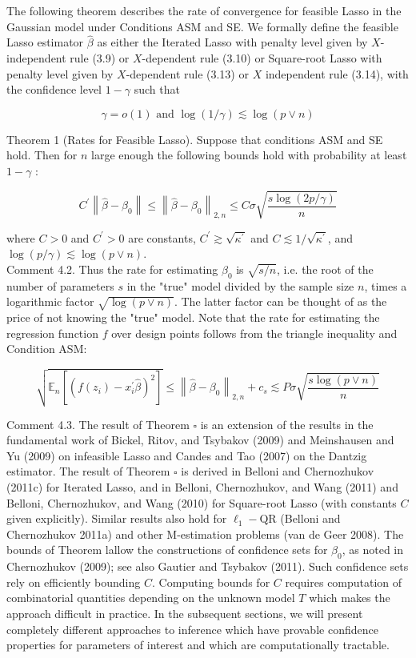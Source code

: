 \documentclass[10pt]{article}
\begin{document}
The following theorem describes the rate of convergence for feasible Lasso in the Gaussian model under Conditions ASM and SE. We formally define the feasible Lasso estimator \(\widehat{\beta}\) as either the Iterated Lasso with penalty level given by \(X\)-independent rule (3.9) or \(X\)-dependent rule (3.10) or Square-root Lasso with penalty level given by \(X\)-dependent rule (3.13) or \(X\) independent rule (3.14), with the confidence level \(1-\gamma\) such that

\[
\gamma=o(1) \text { and } \log (1 / \gamma) \lesssim \log (p \vee n)
\]

Theorem 1 (Rates for Feasible Lasso). Suppose that conditions ASM and SE hold. Then for \(n\) large enough the following bounds hold with probability at least \(1-\gamma\) :

\[
C^{\prime}\left\|\widehat{\beta}-\beta_{0}\right\| \leqslant\left\|\widehat{\beta}-\beta_{0}\right\|_{2, n} \leqslant C \sigma \sqrt{\frac{s \log (2 p / \gamma)}{n}}
\]

where \(C>0\) and \(C^{\prime}>0\) are constants, \(C^{\prime} \gtrsim \sqrt{\kappa^{\prime}}\) and \(C \lesssim 1 / \sqrt{\kappa^{\prime}}\), and \(\log (p / \gamma) \lesssim \log (p \vee n)\).\\
Comment 4.2. Thus the rate for estimating \(\beta_{0}\) is \(\sqrt{s / n}\), i.e. the root of the number of parameters \(s\) in the "true" model divided by the sample size \(n\), times a logarithmic factor \(\sqrt{\log (p \vee n)}\). The latter factor can be thought of as the price of not knowing the "true" model. Note that the rate for estimating the regression function \(f\) over design points follows from the triangle inequality and Condition ASM:

\[
\sqrt{\mathbb{E}_{n}\left[\left(f\left(z_{i}\right)-x_{i}^{\prime} \widehat{\beta}\right)^{2}\right]} \leqslant\left\|\widehat{\beta}-\beta_{0}\right\|_{2, n}+c_{s} \lesssim P \sigma \sqrt{\frac{s \log (p \vee n)}{n}}
\]

Comment 4.3. The result of Theorem \(\square\) is an extension of the results in the fundamental work of Bickel, Ritov, and Tsybakov (2009) and Meinshausen and Yu (2009) on infeasible Lasso and Candes and Tao (2007) on the Dantzig estimator. The result of Theorem \(\square\) is derived in Belloni and Chernozhukov (2011c) for Iterated Lasso, and in Belloni, Chernozhukov, and Wang (2011) and Belloni, Chernozhukov, and Wang (2010) for Square-root Lasso (with constants \(C\) given explicitly). Similar results also hold for \(\ell_{1}-\mathrm{QR}\) (Belloni and Chernozhukov 2011a) and other M-estimation problems (van de Geer 2008). The bounds of Theorem lallow the constructions of confidence sets for \(\beta_{0}\), as noted in Chernozhukov (2009); see also Gautier and Tsybakov (2011). Such confidence sets rely on efficiently bounding \(C\). Computing bounds for \(C\) requires computation of combinatorial quantities depending on the unknown model \(T\) which makes the approach difficult in practice. In the subsequent sections, we will present completely different approaches to inference which have provable confidence properties for parameters of interest and which are computationally tractable.
\end{document}
